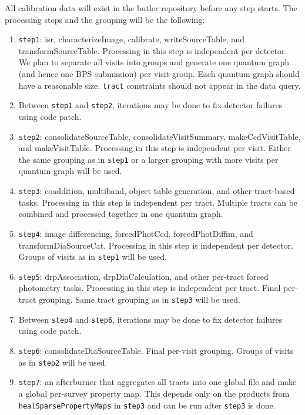 All calibration data will exist in the butler repository before any step starts.
The processing steps and the grouping will be the following:
\begin{enumerate}
  \item \texttt{step1}: isr, characterizeImage, calibrate, writeSourceTable, and transformSourceTable. Processing in this step is independent per detector. We plan to separate all visits into groups and generate one quantum graph (and hence one BPS submission) per visit group. Each quantum graph should have a reasonable size.
\texttt{tract} constraints should not appear in the data query.
  \item Between \texttt{step1} and \texttt{step2}, iterations may be done to fix detector failures using code patch.
  \item \texttt{step2}: consolidateSourceTable, consolidateVisitSummary, makeCcdVisitTable, and makeVisitTable. Processing in this step is independent per visit. Either the same grouping as in \texttt{step1} or a larger grouping with more visits per quantum graph will be used.
  \item \texttt{step3}: coaddition, multiband, object table generation, and other tract-based tasks. Processing in this step is independent per tract. Multiple tracts can be combined and processed together in one quantum graph.
  \item \texttt{step4}: image differencing, forcedPhotCcd, forcedPhotDiffim, and transformDiaSourceCat. Processing in this step is independent per detector. Groups of visits as in \texttt{step1} will be used.
  \item \texttt{step5}: drpAssociation, drpDiaCalculation, and other per-tract forced photometry tasks.
Processing in this step is independent per tract.
Final per-tract grouping.
Same tract grouping as in \texttt{step3} will be used.
  \item Between \texttt{step4} and \texttt{step6}, iterations may be done to fix detector failures using code patch.
  \item \texttt{step6}: consolidateDiaSourceTable. Final per-visit grouping. Groups of visits as in \texttt{step2} will be used.
  \item \texttt{step7}: an afterburner that aggregates all tracts into one global file and make a global per-survey property map.
This depends only on the products from \texttt{healSparsePropertyMaps} in \texttt{step3} and can be run after \texttt{step3} is done.
\end{enumerate}

